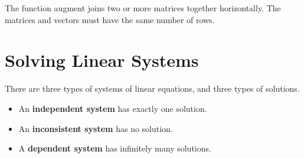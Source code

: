 \documentclass[
]{book}
\providecommand{\tightlist}{%
  \setlength{\itemsep}{0pt}\setlength{\parskip}{0pt}}
\theoremstyle{definition}
\theoremstyle{definition}
\theoremstyle{definition}
\theoremstyle{definition}
\theoremstyle{remark}
\begin{document}
The function augment joins two or more matrices together horizontally.
The matrices and vectors must have the same number of rows.

\section{Solving Linear Systems}\label{solving-linear-systems}

There are three types of systems of linear equations, and three types of solutions.

\begin{itemize}
\tightlist
\item
  An \textbf{independent system} has exactly one solution.
\item
  An \textbf{inconsistent system} has no solution.
\item
  A \textbf{dependent system} has infinitely many solutions.
\end{itemize}
\end{document}
